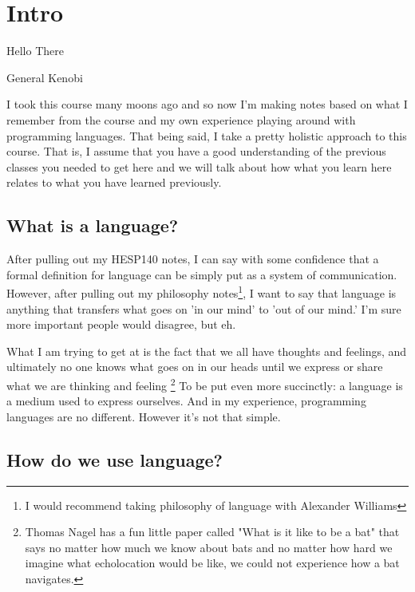 \documentclass[main.tex]{subfiles}
\begin{document}
\chapter{Intro}
\epigraph{Hello There}{General Kenobi}

I took this course many moons ago and so now I'm making notes based on what I remember from the course and my own experience playing around with programming languages. That being said, I take a pretty holistic approach to this course. That is, I assume that you have a good understanding of the previous classes you needed to get here and we will talk about how what you learn here relates to what you have learned previously.

\section{What is a language?}

After pulling out my HESP140 notes, I can say with some confidence that a formal definition for language can be simply put as a system of communication. However, after pulling out my philosophy notes\footnote{I would recommend taking philosophy of language with Alexander Williams }, I want to say that language is anything that transfers what goes on 'in our mind' to 'out of our mind.' I'm sure more important people would disagree, but eh.

What I am trying to get at is the fact that we all have thoughts and feelings, and ultimately no one knows what goes on in our heads until we express or share what we are thinking and feeling \footnote{Thomas Nagel has a fun little paper called "What is it like to be a bat" that says no matter how much we know about bats and no matter how hard we imagine what echolocation would be like, we could not experience how a bat navigates.} To be put even more succinctly: a language is a medium used to express ourselves. And in my experience, programming languages are no different. However it's not that simple. 

\section{How do we use language?}
\end{document}
